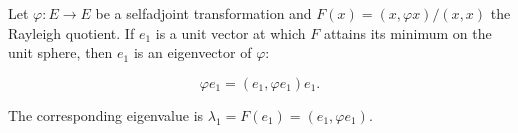 Let $\varphi: E \rightarrow E$ be a selfadjoint transformation and $F(x) = (x, \varphi x)/(x,x)$ the Rayleigh quotient. If $e_1$ is a unit vector at which $F$ attains its minimum on the unit sphere, then $e_1$ is an eigenvector of $\varphi$:

$$\varphi e_1 = (e_1, \varphi e_1) e_1.$$

The corresponding eigenvalue is $\lambda_1 = F(e_1) = (e_1, \varphi e_1)$.
